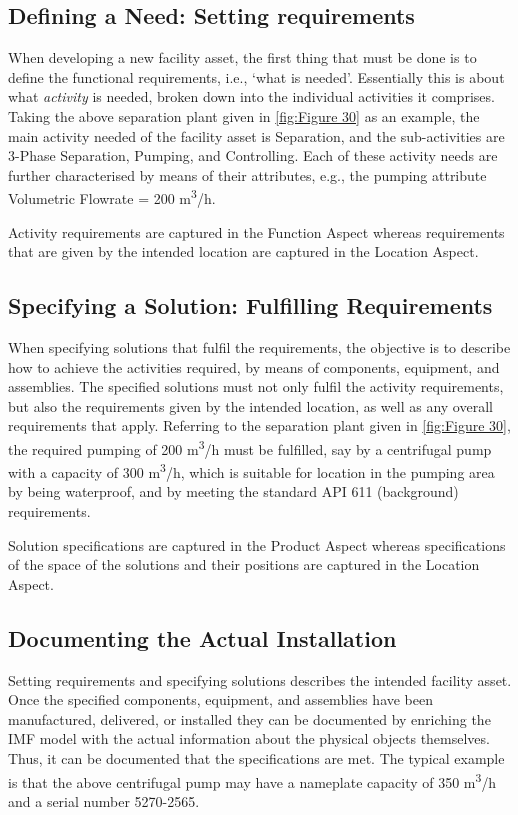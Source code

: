 \documentclass[../main.tex]{subfiles}
\begin{document}
\subsection{Defining a Need: Setting requirements}
When developing a new facility asset, the first thing that must be done is to define the
functional requirements, i.e., `what is needed'. Essentially this is about what \emph{activity} is needed, broken
down into the individual activities it comprises. Taking the above separation plant given in \autoref{fig:Figure 30} as an example,
the main activity needed of the facility asset is Separation, and the sub-activities are 3-Phase Separation,
Pumping, and Controlling. Each of these activity needs are further characterised by means of their attributes,
e.g., the pumping attribute Volumetric Flowrate = 200 m\textsuperscript{3}/h.

Activity requirements are captured in the Function Aspect whereas requirements that are given by the intended location
are captured in the Location Aspect.

\subsection{Specifying a Solution: Fulfilling Requirements}
When specifying solutions that fulfil the requirements, the objective is to describe how
to achieve the activities required, by means of components, equipment, and assemblies. The specified solutions must
not only fulfil the activity requirements, but also the requirements given by the intended location, as well as any
overall requirements that apply. Referring to the separation plant given in \autoref{fig:Figure 30}, the required pumping of 200
m\textsuperscript{3}/h must be fulfilled, say by a centrifugal pump with a capacity of 300 m\textsuperscript{3}/h,
which is suitable for location in the pumping area by being waterproof, and by meeting the standard API 611
(background) requirements.

Solution specifications are captured in the Product Aspect whereas specifications of the space of the solutions and
their positions are captured in the Location Aspect.

\subsection{Documenting the Actual Installation}
Setting requirements and specifying solutions describes the intended facility asset. Once
the specified components, equipment, and assemblies have been manufactured, delivered, or installed they can be
documented by enriching the IMF model with the actual information about the physical objects themselves. Thus, it can
be documented that the specifications are met. The typical example is that the above centrifugal pump may have a
nameplate capacity of 350 m\textsuperscript{3}/h and a serial number 5270-2565.
\end{document}
